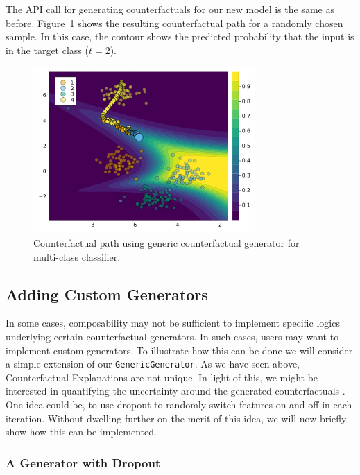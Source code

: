 \documentclass{juliacon}
\begin{document}
The API call for generating counterfactuals for our new model is the
same as before. Figure~\ref{fig-multi} shows the resulting
counterfactual path for a randomly chosen sample. In this case, the
contour shows the predicted probability that the input is in the target
class (\(t=2\)).

\begin{figure}

{\centering \includegraphics[width=3.33333in,height=2.5in]{www/ce_multi.png}

}

\caption{\label{fig-multi}Counterfactual path using generic
counterfactual generator for multi-class classifier.}

\end{figure}

\hypertarget{sec-custom-gen}{%
\subsection{Adding Custom Generators}\label{sec-custom-gen}}

In some cases, composability may not be sufficient to implement specific
logics underlying certain counterfactual generators. In such cases,
users may want to implement custom generators. To illustrate how this
can be done we will consider a simple extension of our
\texttt{GenericGenerator}. As we have seen above, Counterfactual
Explanations are not unique. In light of this, we might be interested in
quantifying the uncertainty around the generated counterfactuals
\autocite{delaney2021uncertainty}. One idea could be, to use dropout to
randomly switch features on and off in each iteration. Without dwelling
further on the merit of this idea, we will now briefly show how this can
be implemented.

\hypertarget{a-generator-with-dropout}{%
\subsubsection{A Generator with
Dropout}\label{a-generator-with-dropout}}
\end{document}
